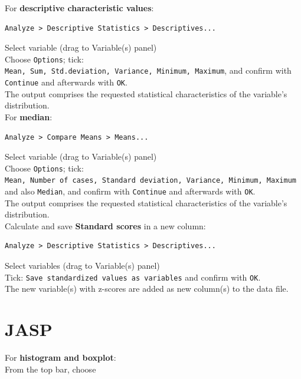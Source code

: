 \documentclass[
]{book}
\begin{document}
For \textbf{descriptive characteristic values}:~

\begin{verbatim}
Analyze > Descriptive Statistics > Descriptives...
\end{verbatim}

Select variable (drag to Variable(s) panel)\\
Choose \texttt{Options}; tick:
\texttt{Mean,\ Sum,\ Std.deviation,\ Variance,\ Minimum,\ Maximum}, and confirm with
\texttt{Continue} and afterwards with \texttt{OK}.\\
The output comprises the requested statistical characteristics of the variable's distribution.\\

For \textbf{median}:\\

\begin{verbatim}
Analyze > Compare Means > Means...
\end{verbatim}

Select variable (drag to Variable(s) panel)\\
Choose \texttt{Options}; tick:
\texttt{Mean,\ Number\ of\ cases,\ Standard\ deviation,\ Variance,\ Minimum,\ Maximum}
and also \texttt{Median}, and confirm with \texttt{Continue} and afterwards with \texttt{OK}.\\
The output comprises the requested statistical characteristics of the variable's distribution.\\

Calculate and save \textbf{Standard scores} in a new column:\\

\begin{verbatim}
Analyze > Descriptive Statistics > Descriptives...
\end{verbatim}

Select variables (drag to Variable(s) panel)\\
Tick: \texttt{Save\ standardized\ values\ as\ variables} and confirm with \texttt{OK}.\\
The new variable(s) with z-scores are added as new
column(s) to the data file.\\

\hypertarget{jasp-3}{%
\section{JASP}\label{jasp-3}}

For \textbf{histogram and boxplot}:\\
From the top bar, choose
\end{document}
